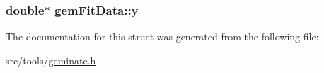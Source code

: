 \hypertarget{structgemFitData_a81db7ce60f65b7f32ae24828fb8f00d7}{
\subsubsection[{y}]{\setlength{\rightskip}{0pt plus 5cm}double$\ast$ {\bf gem\-Fit\-Data\-::y}}}\label{structgemFitData_a81db7ce60f65b7f32ae24828fb8f00d7}


\-The documentation for this struct was generated from the following file\-:\begin{DoxyCompactItemize}
\item 
src/tools/\hyperlink{geminate_8h}{geminate.\-h}\end{DoxyCompactItemize}
